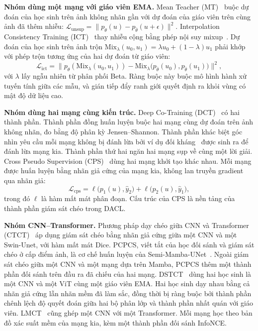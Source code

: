 \textbf{Nhóm dùng một mạng với giáo viên EMA.} Mean Teacher (MT)~\cite{tarvainen2017mt} buộc dự đoán của học sinh trên ảnh không nhãn gần với dự đoán của giáo viên trên cùng ảnh đã thêm nhiễu: $\mathcal{L}_{\mathrm{unsup}}=\|p_\theta(u)-p_{\bar\theta}(u+\epsilon)\|^2$. Interpolation Consistency Training (ICT)~\cite{verma2022ict} thay nhiễu cộng bằng phép nội suy mixup~\cite{zhang2018mixup}. Dự đoán của học sinh trên ảnh trộn $\mathrm{Mix}_\lambda(u_0,u_1)=\lambda u_0+(1-\lambda)u_1$ phải khớp với phép trộn tương ứng của hai dự đoán từ giáo viên:
\begin{equation}
  \mathcal{L}_{\mathrm{ict}}=\big\|p_\theta(\mathrm{Mix}_\lambda(u_0,u_1))-\mathrm{Mix}_\lambda\big(p_{\bar\theta}(u_0),p_{\bar\theta}(u_1)\big)\big\|^2 ,
\end{equation}
với $\lambda$ lấy ngẫu nhiên từ phân phối Beta. Ràng buộc này buộc mô hình hành xử tuyến tính giữa các mẫu, và gián tiếp đẩy ranh giới quyết định ra khỏi vùng có mật độ dữ liệu cao.

\textbf{Nhóm dùng hai mạng cùng kiến trúc.} Deep Co-Training (DCT)~\cite{qiao2018dct} có hai thành phần. Thành phần đồng huấn luyện buộc hai mạng cùng dự đoán trên ảnh không nhãn, đo bằng độ phân kỳ Jensen--Shannon. Thành phần khác biệt góc nhìn yêu cầu mỗi mạng không bị đánh lừa bởi ví dụ đối kháng~\cite{goodfellow2015fgsm} được sinh ra để đánh lừa mạng kia. Thành phần thứ hai ngăn hai mạng sụp về cùng một lời giải. Cross Pseudo Supervision (CPS)~\cite{chen2021cps} dùng hai mạng khởi tạo khác nhau. Mỗi mạng được huấn luyện bằng nhãn giả cứng của mạng kia, không lan truyền gradient qua nhãn giả:
\begin{equation}
  \mathcal{L}_{\mathrm{cps}}=\ell\big(p_1(u),\hat y_2\big)+\ell\big(p_2(u),\hat y_1\big),
  \label{eq:cps-generic}
\end{equation}
trong đó $\ell$ là hàm mất mát phân đoạn. Cấu trúc của CPS là nền tảng của thành phần giám sát chéo trong DACL.

\textbf{Nhóm CNN--Transformer.} Phương pháp dạy chéo giữa CNN và Transformer (CTCT)~\cite{luo2022ctct} áp dụng giám sát chéo bằng nhãn giả cứng giữa một CNN và một Swin-Unet, với hàm mất mát Dice. PCPCS, viết tắt của học đối sánh và giám sát chéo ở cấp điểm ảnh, là cơ chế huấn luyện của Semi-Mamba-UNet~\cite{ma2024semimamba}. Ngoài giám sát chéo giữa một CNN và một mạng dựa trên Mamba, PCPCS thêm một thành phần đối sánh trên đầu ra đã chiếu của hai mạng. DSTCT~\cite{jiang2024dstct} dùng hai học sinh là một CNN và một ViT cùng một giáo viên EMA. Hai học sinh dạy nhau bằng cả nhãn giả cứng lẫn nhãn mềm đã làm sắc, đồng thời bị ràng buộc bởi thành phần chênh lệch độ quyết đoán giữa hai bộ phân lớp và thành phần nhất quán với giáo viên. LMCT~\cite{wang2025lmct} cũng ghép một CNN với một Transformer. Mỗi mạng học theo bản đồ xác suất mềm của mạng kia, kèm một thành phần đối sánh InfoNCE.

